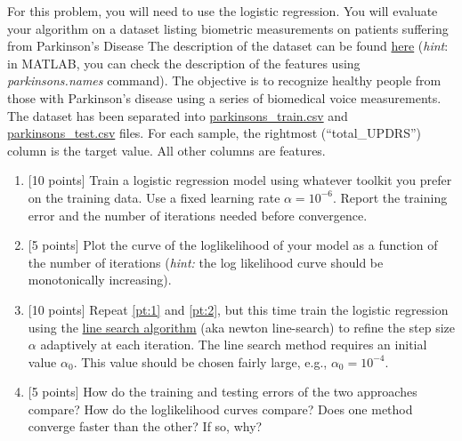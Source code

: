 \documentclass[12pt]{article}
\newenvironment{problem}[2][Problem:]{\begin{trivlist}
\item[\hskip \labelsep {\bfseries #1}\hskip \labelsep {\bfseries #2.}]}{\end{trivlist}}
\begin{document}
\pagebreak

\begin{problem}{Logistic Regression [25 points]}
For this problem, you will need to use the logistic regression.
You will evaluate your algorithm on a dataset listing biometric measurements on patients suffering from Parkinson's Disease 
The description of the dataset can be found \href{https://archive.ics.uci.edu/ml/datasets/parkinsons+telemonitoring}{here} (\textit{hint}: in MATLAB, you can check the description of the features using \textit{parkinsons.names} command). 
The objective is to recognize healthy people from those with Parkinson's disease using a series of biomedical voice measurements.
The dataset has been separated into \href{https://canvas.dartmouth.edu/files/3128597/download?download_frd=1}{parkinsons\_train.csv} and \href{https://canvas.dartmouth.edu/files/3128596/download?download_frd=1}{parkinsons\_test.csv} files. 
For each sample, the rightmost (``total\_UPDRS'') column is the target value.
All other columns are features.

\begin{enumerate}
	\item {[10 points]} Train a logistic regression model using whatever toolkit you prefer on the training data. Use a fixed learning rate $\alpha = 10^{-6}$. Report the training error and the number of iterations needed before convergence. \label{pt:1}
	\item {[5 points]} Plot the curve of the loglikelihood of your model as a function of the number of iterations (\textit{hint:} the log likelihood curve should be monotonically increasing). \label{pt:2}
	\item {[10 points]} Repeat \ref{pt:1} and \ref{pt:2}, but this time train the logistic regression using the \href{https://en.wikipedia.org/wiki/Line_search}{line search algorithm} (aka newton line-search) to refine the step size $\alpha$ adaptively at each iteration. The line search method requires an initial value $\alpha_0$. This value should be chosen fairly large, e.g., $\alpha_0 = 10^{-4}$.
	\item {[5 points]} How do the training and testing errors of the two approaches compare? How do the loglikelihood curves compare? Does one method converge faster than the other? If so, why?
\end{enumerate}
\end{problem}
\end{document}
